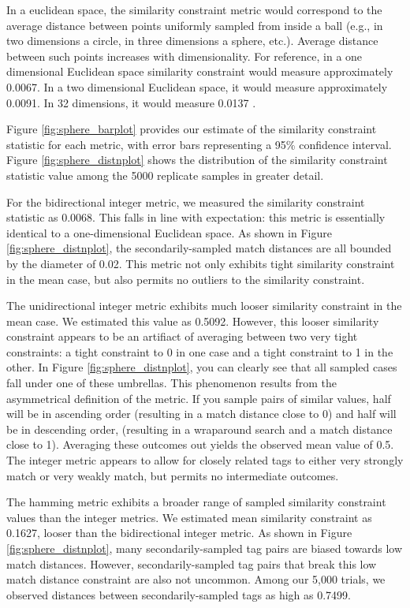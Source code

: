 

In a euclidean space, the similarity constraint metric would correspond to the average distance between points uniformly sampled from inside a ball (e.g., in two dimensions a circle, in three dimensions a sphere, etc.).
Average distance between such points increases with dimensionality.
For reference, in a one dimensional Euclidean space similarity constraint would measure approximately 0.0067.
In a two dimensional Euclidean space, it would measure approximately  0.0091.
In 32 dimensions, it would measure 0.0137 \citep{dunbar1997average}.

Figure \ref{fig:sphere_barplot} provides our estimate of the similarity constraint statistic for each metric, with error bars representing a 95\% confidence interval.
Figure \ref{fig:sphere_distnplot} shows the distribution of the similarity constraint statistic value among the 5000 replicate samples in greater detail.

For the bidirectional integer metric, we measured the similarity constraint statistic as 0.0068.
This falls in line with expectation: this metric is essentially identical to a one-dimensional Euclidean space.
As shown in Figure \ref{fig:sphere_distnplot}, the secondarily-sampled match distances are all bounded by the diameter of 0.02.
This metric not only exhibits tight similarity constraint in the mean case, but also permits no outliers to the similarity constraint.

The unidirectional integer metric exhibits much looser similarity constraint in the mean case.
We estimated this value as 0.5092.
However, this looser similarity constraint appears to be an artifiact of averaging between two very tight constraints: a tight constraint to 0 in one case and a tight constraint to 1 in the other.
In Figure \ref{fig:sphere_distnplot}, you can clearly see that all sampled cases fall under one of these umbrellas.
This phenomenon results from the asymmetrical definition of the metric.
If you sample pairs of similar values, half will be in ascending order (resulting in a match distance close to 0) and half will be in descending order, (resulting in a wraparound search and a match distance close to 1).
Averaging these outcomes out yields the observed mean value of 0.5.
The integer metric appears to allow for closely related tags to either very strongly match or very weakly match, but permits no intermediate outcomes.

The hamming metric exhibits a broader range of sampled similarity constraint values than the integer metrics.
We estimated mean similarity constraint as 0.1627, looser than the bidirectional integer metric.
As shown in Figure \ref{fig:sphere_distnplot}, many secondarily-sampled tag pairs are biased towards low match distances.
However, secondarily-sampled tag pairs that break this low match distance constraint are also not uncommon.
Among our 5,000 trials, we observed distances between secondarily-sampled tags as high as 0.7499.

